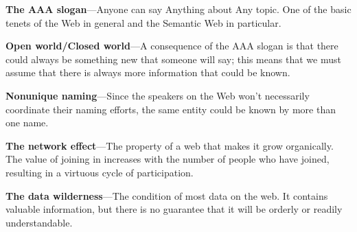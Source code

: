 \textbf{The AAA slogan}---Anyone can say Anything about Any topic. One
of the basic tenets of the Web in general and the Semantic Web in
particular.

\textbf{Open world/Closed world}---A consequence of the AAA slogan is
that there could always be something new that someone will say; this
means that we must assume that there is always more information that
could be known.

\textbf{Nonunique naming}---Since the speakers on the Web won't
necessarily coordinate their naming efforts, the same entity could be
known by more than one name.

\textbf{The network effect}---The property of a web that makes it grow
organically. The value of joining in increases with the number of people
who have joined, resulting in a virtuous cycle of participation.

\textbf{The data wilderness}---The condition of most data on the web. It
contains valuable information, but there is no guarantee that it will be
orderly or readily understandable.



